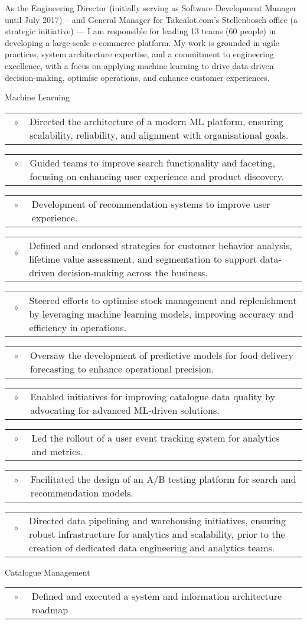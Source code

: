 \documentclass[10pt,a4paper,final]{columncv}
\makeatletter
\newcommand{\cvitembullet}[1]{%
  \begin{tabularx}{\linewidth}{@{}l@{\hspace{0.1em}}X@{}}
    ~$\circ$~ & #1 \\
  \end{tabularx}%
}
\makeatother
\begin{document}
\begin{cvenv}
         {As the Engineering Director (initially serving as Software Development Manager until
          July 2017) – and General Manager for Takealot.com's Stellenbosch office (a strategic
          initiative) — I am responsible for leading 13 teams (60 people) in developing a
          large-scale e-commerce platform. My work is grounded in agile practices, system
          architecture expertise, and a commitment to engineering excellence, with a focus
          on applying machine learning to drive data-driven decision-making, optimise operations,
          and enhance customer experiences.}
         {Machine Learning
           \cvitembullet{Directed the architecture of a modern ML platform, ensuring
             scalability, reliability, and alignment with organisational goals.}
           \cvitembullet{Guided teams to improve search functionality and faceting,
             focusing on enhancing user experience and product discovery.}
           \cvitembullet{Development of recommendation systems to improve user experience.}
           \cvitembullet{Defined and endorsed strategies for customer behavior analysis,
             lifetime value assessment, and segmentation to support
             data-driven decision-making across the business.}
           \cvitembullet{Steered efforts to optimise stock management and replenishment
             by leveraging machine learning models, improving accuracy and
             efficiency in operations.}
           \cvitembullet{Oversaw the development of predictive models for food delivery
             forecasting to enhance operational precision.}
           \cvitembullet{Enabled initiatives for improving catalogue data quality by
             advocating for advanced ML-driven solutions.}
           \cvitembullet{Led the rollout of a user event tracking system for
             analytics and metrics.}
           \cvitembullet{Facilitated the design of an A/B testing platform for search and
             recommendation models.}
           \cvitembullet{Directed data pipelining and warehousing initiatives, ensuring
             robust infrastructure for analytics and scalability, prior to the
             creation of dedicated data engineering and analytics teams.}
          Catalogue Management
            \cvitembullet{Defined and executed a system and information architecture roadmap
}}
\end{cvenv}
\end{document}
